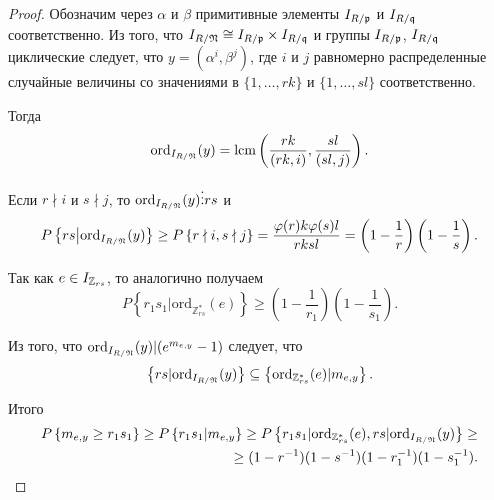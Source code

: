 \documentclass[_00_dissertation.tex]{subfiles}
\begin{document}
\begin{proof}
    Обозначим через $\alpha$ и $\beta$ примитивные элементы $I_{R / \mathfrak{p}}$ и $I_{R / \mathfrak{q}}$ соответственно.
    Из того, что $I_{R / \mathfrak{N}} \cong I_{R / \mathfrak{p}} \times I_{R / \mathfrak{q}}$ и группы $I_{R / \mathfrak{p}}$, $I_{R / \mathfrak{q}}$ циклические следует, что $y = (\alpha^i, \beta^j)$, где $i$ и $j$ равномерно распределенные случайные величины со значениями в $\{1, \ldots, rk\}$ и $\{1, \ldots, s l\}$ соответственно.
    
    Тогда
    \begin{equation*}
        \textrm{ord}_{I_{R / \mathfrak{N}}}(y) = \textrm{lcm}\left(\frac{rk}{(rk,i)}, \frac{sl}{(sl,j)}\right).
    \end{equation*}

    Если $r \nmid i$ и $s \nmid j$, то $\textrm{ord}_{I_{R / \mathfrak{N}}}(y) \vdots rs$ и
    \begin{equation*}
        P\left\{
            rs \big| \textrm{ord}_{I_{R / \mathfrak{N}}}(y)
        \right\} \ge P\left\{
            r\nmid i, s \nmid j
        \right\} = \frac{\varphi(r)k\varphi(s)l}{rksl} = \left(
            1-\frac{1}{r}
        \right)\left(
            1-\frac{1}{s}
        \right).
    \end{equation*}

    Так как $e \in I_{\mathbb{Z}_{rs}}$, то аналогично получаем
    \begin{equation*}
        P\left\{
            r_1s_1|\textrm{ord}_{\mathbb{Z}^*_{rs}}(e)
        \right\} \ge \left(
            1-\frac{1}{r_1}
        \right)\left(
            1-\frac{1}{s_1}
        \right).
    \end{equation*}

    Из того, что $\textrm{ord}_{I_{R / \mathfrak{N}}}(y) | (e^{m_{e,y}}-1)$ следует, что
    \begin{equation*}
        \left\{
            rs | \textrm{ord}_{I_{R / \mathfrak{N}}}(y)
        \right\} \subseteq \left\{
            \textrm{ord}_{\mathbb{Z}^*_{rs}}(e) | m_{e,y}
        \right\}.
    \end{equation*}

    Итого
    \begin{equation*}
        \begin{split}
            P\left\{
                m_{e,y} \ge r_1s_1
            \right\} \ge P\left\{
                r_1s_1 | m_{e,y}
            \right\} \ge P\left\{
                r_1s_1|\textrm{ord}_{\mathbb{Z}^*_{rs}}(e), rs|\textrm{ord}_{I_{R / \mathfrak{N}}}(y)
            \right\} \ge \\
            \ge (1-r^{-1})(1-s^{-1})(1-r_1^{-1})(1-s_1^{-1}).
        \end{split}
    \end{equation*}
\end{proof}
\end{document}

